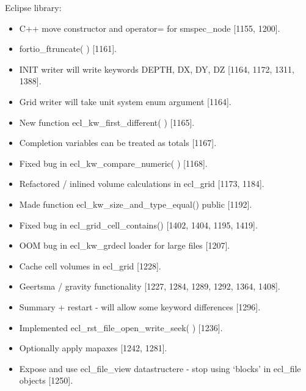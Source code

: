\documentclass[a4paper,10pt,english]{sphinxmanual}
\begin{document}
Eclipse library:
\begin{itemize}
\item {} 
C++ move constructor and operator= for smspec\_node {[}1155, 1200{]}.

\item {} 
fortio\_ftruncate( ) {[}1161{]}.

\item {} 
INIT writer will write keywords DEPTH, DX, DY, DZ {[}1164, 1172, 1311, 1388{]}.

\item {} 
Grid writer will take unit system enum argument {[}1164{]}.

\item {} 
New function ecl\_kw\_first\_different( ) {[}1165{]}.

\item {} 
Completion variables can be treated as totals {[}1167{]}.

\item {} 
Fixed bug in ecl\_kw\_compare\_numeric( ) {[}1168{]}.

\item {} 
Refactored / inlined volume calculations in ecl\_grid {[}1173, 1184{]}.

\item {} 
Made function ecl\_kw\_size\_and\_type\_equal() public {[}1192{]}.

\item {} 
Fixed bug in ecl\_grid\_cell\_contains() {[}1402, 1404, 1195, 1419{]}.

\item {} 
OOM bug in ecl\_kw\_grdecl loader for large files {[}1207{]}.

\item {} 
Cache cell volumes in ecl\_grid {[}1228{]}.

\item {} 
Geertsma / gravity functionality {[}1227, 1284, 1289, 1292, 1364, 1408{]}.

\item {} 
Summary + restart - will allow some keyword differences {[}1296{]}.

\item {} 
Implemented ecl\_rst\_file\_open\_write\_seek( ) {[}1236{]}.

\item {} 
Optionally apply mapaxes {[}1242, 1281{]}.

\item {} 
Expose and use ecl\_file\_view datastructere - stop using ‘blocks’ in ecl\_file objects {[}1250{]}.


\end{itemize}
\end{document}

